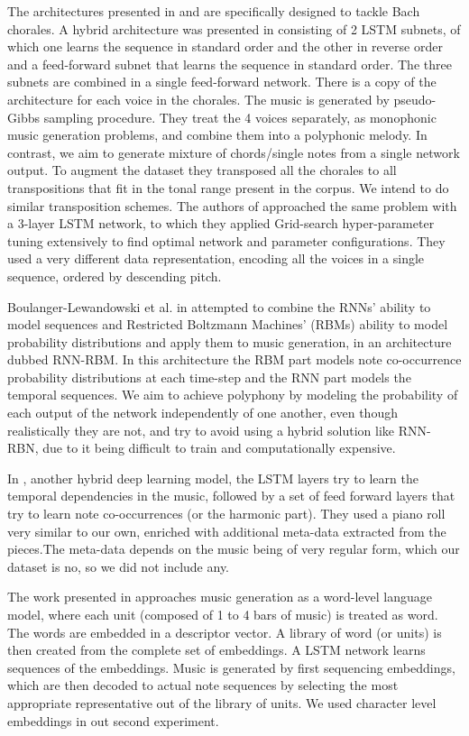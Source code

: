 The architectures presented in \cite{Hadjeres2016} and \cite{Liang2017} are specifically designed to tackle Bach chorales. A hybrid architecture was presented in \cite{Hadjeres2016} consisting of 2 LSTM subnets, of which one learns the sequence in standard order and the other in reverse order and a feed-forward subnet that learns the sequence in standard order. The three subnets are combined in a single feed-forward network. There is a copy of the architecture for each voice in the chorales. The music is generated by pseudo-Gibbs sampling procedure. They treat the 4 voices separately, as monophonic music generation problems, and combine them into a polyphonic melody. In contrast, we aim to generate mixture of chords/single notes from a single network output. To augment the dataset they transposed all the chorales to all transpositions that fit in the tonal range present in the corpus. We intend to do similar transposition schemes. The authors of \cite{Liang2017} approached the same problem with a 3-layer LSTM network, to which they applied Grid-search hyper-parameter tuning extensively to find optimal network and parameter configurations. They used a very different data representation, encoding all the voices in a single sequence, ordered by descending pitch.

Boulanger-Lewandowski et al. in \cite{Boulanger-Lewandowski2014} attempted to combine the RNNs' ability to model sequences and Restricted Boltzmann Machines' (RBMs) ability to model probability distributions and apply them to music generation, in an architecture dubbed RNN-RBM. In this architecture the RBM part models note co-occurrence probability distributions at each time-step and the RNN part models the temporal sequences. We aim to achieve polyphony by modeling  the probability of each output of the network independently of one another, even though realistically they are not, and try to avoid using a hybrid solution like RNN-RBN, due to it being difficult to train and computationally expensive.

In \cite{Johnson2017}, another hybrid deep learning model, the LSTM layers try to learn the temporal dependencies in the music, followed by a set of feed forward layers that try to learn note co-occurrences (or the harmonic part). They used a piano roll very similar to our own, enriched with additional meta-data extracted from the pieces.The meta-data depends on the music being of very regular form, which our dataset is no, so we did not include any.

The work presented in \cite{Bretan2016} approaches music generation as a word-level language model, where each unit (composed of 1 to 4 bars of music) is treated as word. The words are embedded in a descriptor vector. A library of word (or units) is then created from the complete set of embeddings. A LSTM network learns sequences of the embeddings. Music is generated by first sequencing embeddings, which are then decoded to actual note sequences by selecting the most appropriate representative out of the library of units. We used character level embeddings in out second experiment.

